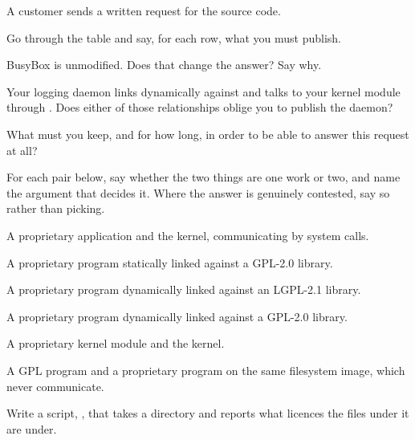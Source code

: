 \noindent A customer sends a written request for the source code.

 Go through the table and say, for each row, what you must publish.

 BusyBox is unmodified. Does that change the answer? Say why.

 Your logging daemon links dynamically against  and talks to your kernel
module through . Does either of those relationships oblige you to publish the daemon?

 What must you keep, and for how long, in order to be able to answer this request at all?

\label{c1:ex:5}

For each pair below, say whether the two things are one work or two, and name the argument that
decides it. Where the answer is genuinely contested, say so rather than picking.

 A proprietary application and the kernel, communicating by system calls.

 A proprietary program statically linked against a GPL-2.0 library.

 A proprietary program dynamically linked against an LGPL-2.1 library.

 A proprietary program dynamically linked against a GPL-2.0 library.

 A proprietary kernel module and the kernel.

 A GPL program and a proprietary program on the same filesystem image, which never
communicate.

\label{c1:ex:6}

Write a script, , that takes a directory and reports what
licences the files under it are under.

